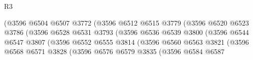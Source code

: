 \begin{lexlean}{R3}
\begin{coremodule}
                                            (@3596
                                              @6504
                                              @6507
                                              @3772
                                              (@3596
                                                @6512
                                                @6515
                                                @3779
                                                (@3596
                                                  @6520
                                                  @6523
                                                  @3786
                                                  (@3596
                                                    @6528
                                                    @6531
                                                    @3793
                                                    (@3596
                                                      @6536
                                                      @6539
                                                      @3800
                                                      (@3596
                                                        @6544
                                                        @6547
                                                        @3807
                                                        (@3596
                                                          @6552
                                                          @6555
                                                          @3814
                                                          (@3596
                                                            @6560
                                                            @6563
                                                            @3821
                                                            (@3596
                                                              @6568
                                                              @6571
                                                              @3828
                                                              (@3596
                                                                @6576
                                                                @6579
                                                                @3835
                                                                (@3596
                                                                  @6584
                                                                  @6587

\end{coremodule}
\end{lexlean}
